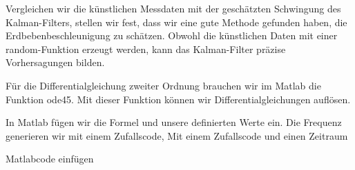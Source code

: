 Vergleichen wir die künstlichen Messdaten mit der geschätzten Schwingung des Kalman-Filters, stellen wir fest, dass wir eine gute Methode gefunden haben, die Erdbebenbeschleunigung zu schätzen.
Obwohl die künstlichen Daten mit einer random-Funktion erzeugt werden, kann das Kalman-Filter präzise Vorhersagungen bilden.

Für die Differentialgleichung zweiter Ordnung brauchen wir im Matlab die Funktion ode45.
Mit dieser Funktion können wir Differentialgleichungen auflösen.













In Matlab fügen wir die Formel und unsere definierten Werte ein.
Die Frequenz generieren wir mit einem Zufallscode, 
Mit einem Zufallscode und einen Zeitraum 

Matlabcode einfügen

